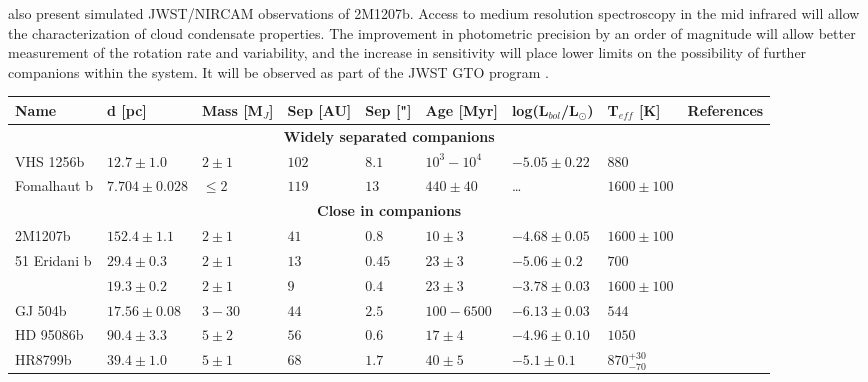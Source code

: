 \parencite{Zhou2019} also present simulated JWST/NIRCAM observations of 2M1207b. Access to medium resolution spectroscopy in the mid infrared will allow the characterization of cloud condensate properties. 
The improvement in photometric precision by an order of magnitude will allow better measurement of the rotation rate and variability, and the increase in sensitivity will place lower limits on the possibility of further companions within the system.
It will be observed as part of the JWST GTO program \parencite{Birkmann2019}.

\begin{landscape}
	\begin{table}[t]
		\centering
		\begin{small}
			\begin{tabular}{lllllllll}
				\toprule
				\textbf{Name} & \textbf{d [pc]} & \textbf{Mass [M$_{J}$]} & \textbf{Sep [AU]} & \textbf{Sep ["]} & \textbf{Age [Myr]} & \textbf{log(L$_{bol}$/L$_{\odot}$)} & \textbf{T$_{eff}$ [K]} & \textbf{References}\\
				\midrule
				\multicolumn{9}{c}{\textbf{Widely separated companions}}\\
				\midrule
				VHS 1256b & $12.7\pm1.0$  & $2\pm1$     & $102$ & $8.1$ & $10^{3}-10^{4}$ & $-5.05\pm0.22$ & $880$ & \parencite{Gauza2015}\\
				Fomalhaut b & $7.704\pm0.028$ & $\leq 2$ & $119$ & $13$ & $440\pm40$ & \ldots & $1600\pm100$ &\\
				\midrule
				\multicolumn{9}{c}{\textbf{Close in companions}}\\
				\midrule
				2M1207b   & $152.4\pm1.1$ & $2\pm1$     & $41$ & $0.8$ & $10\pm3$ & $-4.68\pm0.05$ & $1600\pm100$ &\\
				51 Eridani b & $29.4\pm0.3$ & $2\pm1$   & $13$ & $0.45$ & $23\pm3$ & $-5.06\pm0.2$ & $700$ &  \parencite{Macintosh2015}\\
				\bpic     & $19.3\pm0.2$  & $2\pm1$     & $9$ & $0.4$ & $23\pm3$ & $-3.78\pm0.03$ & $1600\pm100$ & \parencite{Quanz2010}\\
				GJ 504b   & $17.56\pm0.08$  & $3-30$    & $44$ & $2.5$ & $100-6500$ & $-6.13\pm0.03$ & $544$ & \parencite{Skemer2016}\\
				HD 95086b & $90.4\pm3.3$  & $5\pm2$     & $56$ & $0.6$ & $17\pm4$ & $-4.96\pm0.10$ & $1050$  &\parencite{DeRosa2016}\\	
				HR8799b   & $39.4\pm1.0$  & $5\pm1$     & $68$ & $1.7$ & $40\pm5$ & $-5.1\pm0.1$ & $870^{+30}_{-70}$ & \parencite{Marois2008,Skemer2012}\\

\end{tabular}
\end{small}
\end{table}
\end{landscape}
